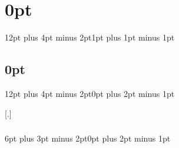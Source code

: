 \titlespacing\section{0pt}{12pt plus 4pt minus 2pt}{1pt plus 1pt minus 1pt}

\titleformat{\subsection}{\bfseries\sffamily\raggedright}{\thesubsection}{0.5em}{}
\titlespacing\subsection{0pt}{12pt plus 4pt minus 2pt}{0pt plus 2pt minus 1pt}

\titleformat{\subsubsection}[runin]{\bfseries\sffamily}{\thesubsubsection}{0.5em}{}[.\hspace*{0.5em}]
\titlespacing\subsubsection{\parindent}{6pt plus 3pt minus 2pt}{0pt plus 2pt minus 1pt}


\usepackage{fancyhdr}              %
\pagestyle{fancy}                  %
\fancyhf{}                         %
\fancyfoot[R]{\thepage}            %
\renewcommand{\footrulewidth}{1pt} %
\renewcommand{\headrulewidth}{0pt} %

